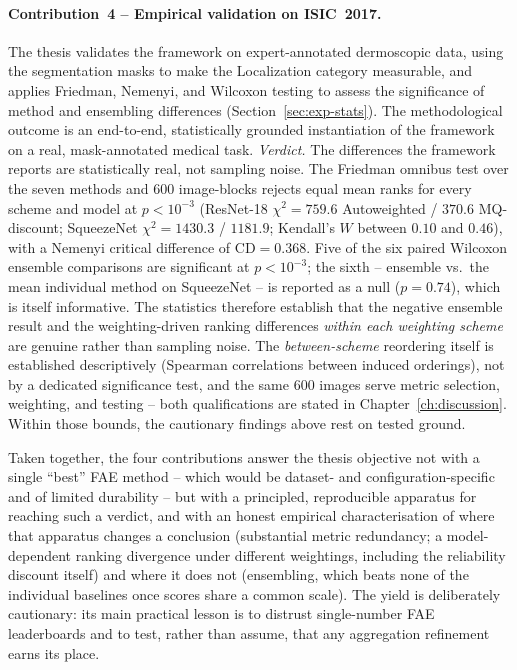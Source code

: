 \paragraph{Contribution~4 -- Empirical validation on ISIC~2017.}
The thesis validates the framework on expert-annotated dermoscopic data, using
the segmentation masks to make the Localization category measurable, and
applies Friedman, Nemenyi, and Wilcoxon testing to assess the significance of
method and ensembling differences (Section~\ref{sec:exp-stats}). The
methodological outcome is an end-to-end, statistically grounded instantiation of
the framework on a real, mask-annotated medical task.
\emph{Verdict.} The differences the framework reports are statistically real,
not sampling noise. The Friedman omnibus test over the seven methods and 600
image-blocks rejects equal mean ranks for every scheme and model at
$p < 10^{-3}$ (ResNet-18 $\chi^2 = 759.6$ Autoweighted / $370.6$
MQ-discount; SqueezeNet $\chi^2 = 1430.3$ / $1181.9$; Kendall's $W$ between
$0.10$ and $0.46$), with a Nemenyi critical difference of
$\mathrm{CD} = 0.368$. Five of the six paired Wilcoxon ensemble comparisons
are significant at $p < 10^{-3}$; the sixth -- ensemble vs.\ the mean
individual method on SqueezeNet -- is reported as a null
($p = 0.74$), which is itself informative. The statistics therefore
establish that the negative ensemble result and the weighting-driven
ranking differences \emph{within each weighting scheme} are genuine rather
than sampling noise. The \emph{between-scheme} reordering itself is
established descriptively (Spearman correlations between induced
orderings), not by a dedicated significance test, and the same 600 images
serve metric selection, weighting, and testing -- both qualifications are
stated in Chapter~\ref{ch:discussion}. Within those bounds, the cautionary
findings above rest on tested ground.

Taken together, the four contributions answer the thesis objective not with a
single ``best'' FAE method -- which would be dataset- and configuration-specific
and of limited durability -- but with a principled, reproducible apparatus for
reaching such a verdict, and with an honest empirical characterisation of where
that apparatus changes a conclusion (substantial metric redundancy; a
model-dependent ranking divergence under different weightings, including the
reliability discount itself) and where it does
not (ensembling,
which beats none of the individual baselines once scores share a common
scale). The yield is
deliberately cautionary: its main practical lesson is to distrust single-number
FAE leaderboards and to test, rather than assume, that any aggregation
refinement earns its place.

